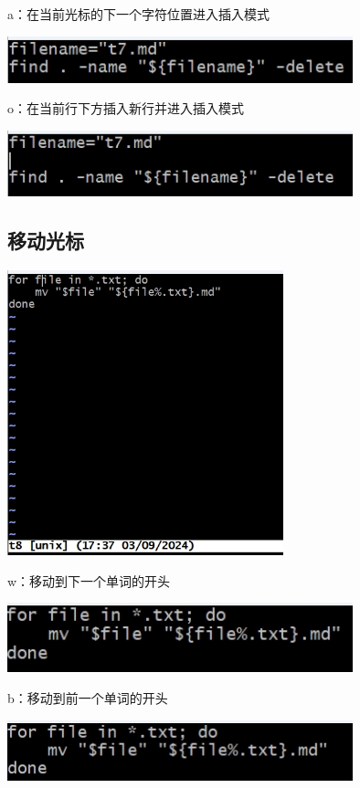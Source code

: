 \documentclass[UTF8,a4paper]{ctexart}
\begin{document}
\begin{sloppypar}
	a：在当前光标的下一个字符位置进入插入模式
	
	\includegraphics[width = 10cm]{47}
	
	o：在当前行下方插入新行并进入插入模式
	
	\includegraphics[width = 10cm]{48}
	
	\subsection{移动光标}
	
	\includegraphics[width = 8cm]{49}
	
	w：移动到下一个单词的开头
	
	\includegraphics[width = 10cm]{50}
	
	b：移动到前一个单词的开头
	
	\includegraphics[width = 10cm]{51}
	

\end{sloppypar}
\end{document}
